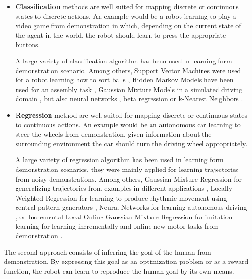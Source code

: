 \begin{itemize}

\item \textbf{Classification} methods are well suited for mapping discrete or continuous states to discrete actions. An example would be a robot learning to play a video game from demonstration in which, depending on the current state of the agent in the world, the robot should learn to press the appropriate buttons.

A large variety of classification algorithm has been used in learning form demonstration scenario. Among others, Support Vector Machines were used for a robot learning how to sort balls \cite{chernova2008teaching}, Hidden Markov Models have been used for an assembly task \cite{hovland1996skill}, Gaussian Mixture Models in a simulated driving domain \cite{chernova09jair}, but also neural networks \cite{mataric2000sensory}, beta regression \cite{montesano2009learning} or k-Nearest Neighbors \cite{saunders2006teaching}.

\item \textbf{Regression} method are well suited for mapping discrete or continuous states to continuous actions. An example would be an autonomous car learning to steer the wheels from demonstration, given information about the surrounding environment the car should turn the driving wheel appropriately.

A large variety of regression algorithm has been used in learning form demonstration scenarios, they were mainly applied for learning trajectories from noisy demonstrations. Among others, Gaussian Mixture Regression for generalizing trajectories from examples in different applications \cite{calinon07}, Locally Weighted Regression for learning to produce rhythmic movement using central pattern generators \cite{schaal1998programmable,ijspeert2002learning}, Neural Networks for learning autonomous driving \cite{pomerleau1991efficient}, or Incremental Local Online Gaussian Mixture Regression for imitation learning for learning incrementally and online new motor tasks from demonstration \cite{cederborg2010incremental}.

\end{itemize}

The second approach consists of inferring the goal of the human from demonstration. By expressing this goal as an optimization problem or as a reward function, the robot can learn to reproduce the human goal by its own means.

